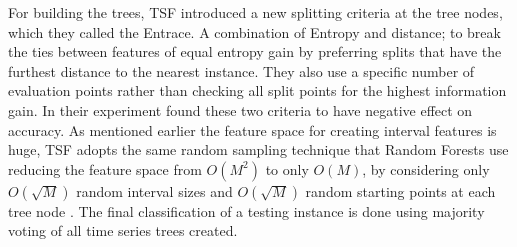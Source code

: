 For building the trees, TSF introduced a new splitting criteria at the tree nodes, which they called the Entrace. A combination of
Entropy and distance; to break the ties between features of equal entropy gain by preferring splits that have the furthest distance
to the nearest instance. They also use a specific number of evaluation points rather than checking all split points for the highest
information gain. In their experiment \cite{bagnall2017great} found these two criteria to have negative effect on accuracy.\newline
As mentioned earlier the feature space for creating interval features is huge, TSF adopts the same random sampling technique that Random Forests use
reducing the feature space from $O(M^{2})$ to only $O(M)$, by considering only $O(\sqrt{M})$ random interval sizes and $O(\sqrt{M})$
random starting points at each tree node \cite{deng2013time}. The final classification of a testing instance is done using majority
voting of all time series trees created.